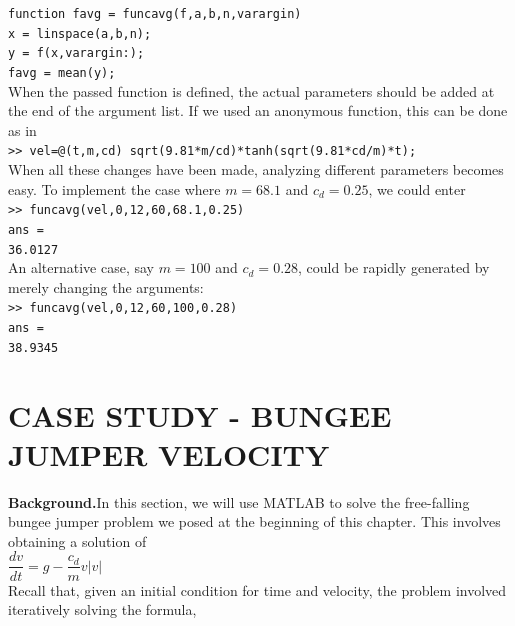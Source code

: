 \documentclass[../main.tex]{subfiles}
\begin{document}
\texttt{function favg = funcavg(f,a,b,n,varargin)\\
\indent x = linspace(a,b,n);\\
\indent y = f(x,varargin{:});\\
\indent favg = mean(y);}\\

When the passed function is defined, the actual parameters should be added at the end
of the argument list. If we used an anonymous function, this can be done as in\\

\texttt{>> vel=@(t,m,cd) sqrt(9.81*m/cd)*tanh(sqrt(9.81*cd/m)*t);}\\

\noindent
When all these changes have been made, analyzing different parameters becomes easy. To
implement the case where $m = 68.1$ and $c_d = 0.25$, we could enter\\

\texttt{>> funcavg(vel,0,12,60,68.1,0.25)\\
\indent ans =\\
\indent\hspace{2mm} 36.0127}\\

\noindent
An alternative case, say $m = 100$ and $c_d = 0.28$, could be rapidly generated by merely
changing the arguments:\\

\texttt{>> funcavg(vel,0,12,60,100,0.28)\\
\indent ans =\\
\indent\hspace{2mm} 38.9345}\\

\section{CASE STUDY - BUNGEE JUMPER VELOCITY}
\noindent\textbf{Background.}\quad In this section, we will use MATLAB to solve the free-falling bungee
jumper problem we posed at the beginning of this chapter. This involves obtaining a solution
of\\

$\dfrac{dv}{dt} = g - \dfrac{c_d}{m}v\left\lvert v \right\rvert$\\

Recall that, given an initial condition for time and velocity, the problem involved iteratively
solving the formula,\\
\end{document}
